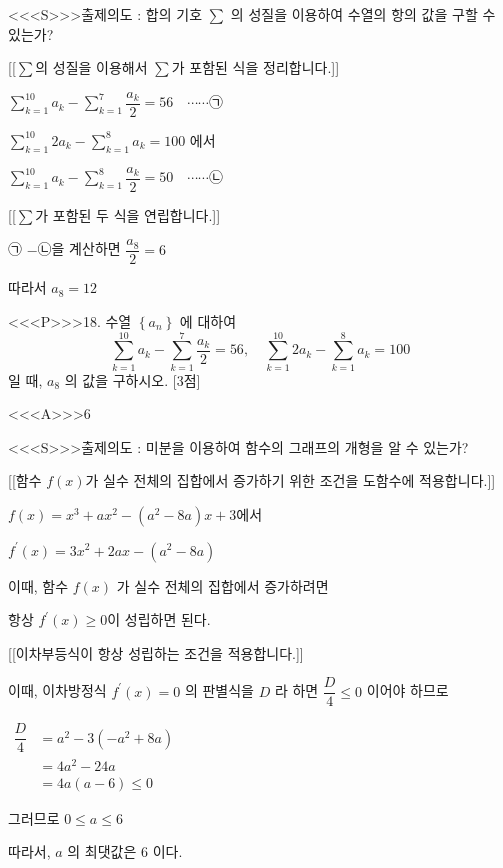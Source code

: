 \documentclass{oblivoir}
\begin{document}
<<<S>>>출제의도 : 합의 기호 $\displaystyle\sum$ 의 성질을 이용하여 수열의 항의 값을 구할 수 있는가?

[[$\displaystyle\sum$의 성질을 이용해서 $\displaystyle\sum$가 포함된 식을 정리합니다.]]

$\displaystyle\sum_{k=1}^{10} a_{k}-\displaystyle\sum_{k=1}^{7} \dfrac{a_{k}}{2}=56 \quad \cdots \cdots $㉠

$\displaystyle\sum_{k=1}^{10} 2 a_{k}-\displaystyle\sum_{k=1}^{8} a_{k}=100$ 에서

$\displaystyle\sum_{k=1}^{10} a_{k}-\displaystyle\sum_{k=1}^{8} \dfrac{a_{k}}{2}=50 \quad \cdots \cdots $㉡

[[$\displaystyle\sum$가 포함된 두 식을 연립합니다.]]

㉠ $-$㉡을 계산하면  $\dfrac{a_{8}}{2}=6$

따라서 $a_{8}=12$

<<<P>>>18. 수열 $\left\{a_{n}\right\}$ 에 대하여
$$
\displaystyle\sum_{k=1}^{10} a_{k}-\displaystyle\sum_{k=1}^{7} \dfrac{a_{k}}{2}=56, \quad \displaystyle\sum_{k=1}^{10} 2 a_{k}-\displaystyle\sum_{k=1}^{8} a_{k}=100
$$
일 때, $a_{8}$ 의 값을 구하시오. [3점]



<<<A>>>$6$

<<<S>>>출제의도 : 미분을 이용하여 함수의 그래프의 개형을 알 수 있는가?

[[함수 $f(x)$가 실수 전체의 집합에서 증가하기 위한 조건을 도함수에 적용합니다.]]

$f(x)=x^{3}+a x^{2}-\left(a^{2}-8 a\right) x+3$에서

$f^{\prime}(x)=3 x^{2}+2 a x-\left(a^{2}-8 a\right)$

이때, 함수 $f(x)$ 가 실수 전체의 집합에서 증가하려면

항상 $f^{\prime}(x) \geq 0$이 성립하면 된다.

[[이차부등식이 항상 성립하는 조건을 적용합니다.]]

이때, 이차방정식 $f^{\prime}(x)=0$ 의 판별식을 $D$ 라 하면 $\dfrac{D}{4} \leq 0$ 이어야 하므로

$\begin{aligned} \dfrac{D}{4} &=a^{2}-3\left(-a^{2}+8 a\right)\\
&=4 a^{2}-24 a\\
&=4 a(a-6) \leq 0 \end{aligned}$

그러므로 $0 \leq a \leq 6$

따라서, $a$ 의 최댓값은 $6$ 이다.
\end{document}
